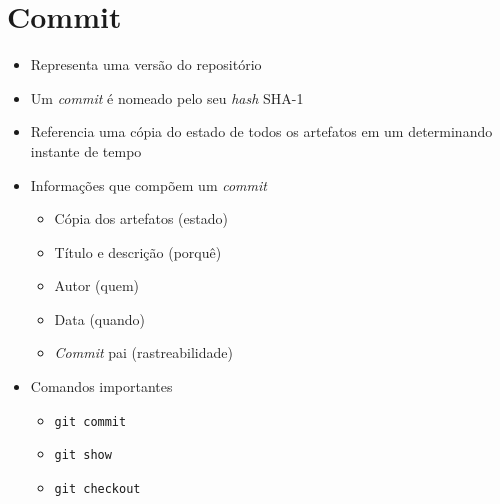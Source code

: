\documentclass{beamer}
\newenvironment{slide}{\begin{frame}{\insertsection}}{\end{frame}}
\begin{document}
\section{Commit}
\begin{slide}
    \begin{itemize}
        \item Representa uma versão do repositório
        \pause
        \item Um \emph{commit} é nomeado pelo seu \emph{hash} SHA-1
        \pause
        \item Referencia uma cópia do estado de todos os artefatos em um
            determinando instante de tempo
        \pause
        \item Informações que compõem um \emph{commit}
        \begin{itemize}
            \pause
            \item Cópia dos artefatos \pause (estado)
            \pause
            \item Título e descrição \pause (porquê)
            \pause
            \item Autor \pause (quem)
            \pause
            \item Data \pause (quando)
            \pause
            \item \emph{Commit} pai \pause (rastreabilidade)
        \end{itemize}
        \pause
        \item Comandos importantes
        \begin{itemize}
            \pause
            \item \texttt{git commit}
            \pause
            \item \texttt{git show}
            \pause
            \item \texttt{git checkout}
        \end{itemize}
    \end{itemize}
\end{slide}
\end{document}
